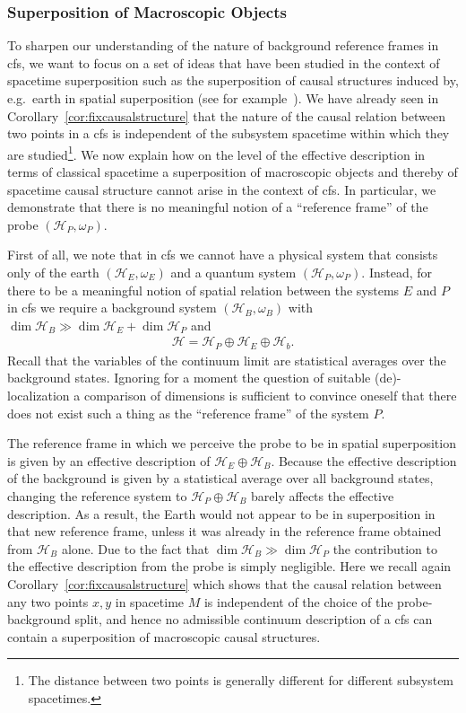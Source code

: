\documentclass[reqno,11pt]{amsart}
\renewcommand{\H}{\mathcal{H}}
\numberwithin{equation}{section}
\begin{document}
\subsubsection{Superposition of Macroscopic Objects}
To sharpen our understanding of the nature of background reference frames in \ac{cfs}, we want to focus on a set of
ideas that have been studied in the context of spacetime superposition such as the superposition of
causal structures induced by, e.g.~earth in spatial superposition (see for example~\cite{zych2019bell}).
We have already seen in Corollary~\ref{cor:fixcausalstructure} that the nature of the causal relation between two points
in a \ac{cfs} is independent of the subsystem spacetime within which they are studied\footnote{
    The distance between two points is generally different for different subsystem spacetimes.
}.
We now explain how on the level of the effective description in terms of classical spacetime a superposition of macroscopic
objects and thereby of spacetime causal structure cannot arise in the context of \ac{cfs}.
In particular, we demonstrate that there is no meaningful notion of a ``reference frame'' of the probe $(\H_P, \omega_P)$.

First of all, we note that in \ac{cfs} we cannot have a physical system
that consists only of the earth $(\H_E, \omega_E)$ and a quantum system $(\H_P, \omega_P)$.
Instead, for there to be a meaningful notion of spatial relation between the systems $E$ and $P$ in \ac{cfs} we require
a background system $(\H_B, \omega_B)$ with $\dim \H_B \gg \dim \H_E + \dim \H_P$ and
\begin{align}
    \H = \H_P \oplus \H_E \oplus \H_b.
\end{align}
Recall that the variables of the continuum limit are statistical averages over the background states.
Ignoring for a moment the question of suitable (de)-localization a comparison of dimensions is sufficient to convince oneself
that there does not exist such a thing as the ``reference frame'' of the system $P$.

The reference frame in which we perceive the probe to be in spatial superposition is given by an effective description of $\H_E \oplus \H_B$.
Because the effective description of the background is given by a statistical average over all background states,
changing the reference system to $\H_P \oplus \H_B$ barely affects the effective description.
As a result, the Earth would not appear to be in superposition in that new reference frame,
unless it was already in the reference frame obtained from $\H_B$ alone.
Due to the fact that $\dim \H_B \gg \dim \H_P$ the contribution to the effective description from the probe is simply negligible.
Here we recall again Corollary~\ref{cor:fixcausalstructure} which shows
that the causal relation between any two points $x, y$ in spacetime $M$ is independent of the choice of the probe-background split,
and hence no admissible continuum description of a \ac{cfs} can contain a superposition of macroscopic causal structures.
\end{document}
